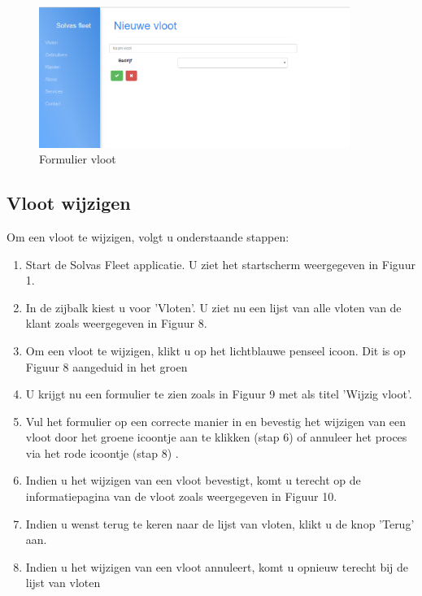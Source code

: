\documentclass[11pt,openany]{article}
\begin{document}
\begin{figure}
	\centering
	\includegraphics[width=0.9\textwidth]{fig9.png}
	\caption{Formulier vloot}
\end{figure}
\newpage

\subsection{Vloot wijzigen}
Om een vloot te wijzigen, volgt u onderstaande stappen:
\begin{enumerate}
	\item Start de Solvas Fleet applicatie. U ziet het startscherm weergegeven in Figuur 1.
	\item In de zijbalk kiest u voor 'Vloten'. U ziet nu een lijst van alle vloten van de klant zoals weergegeven in Figuur 8.
	\item Om een vloot te wijzigen, klikt u op het lichtblauwe penseel icoon. Dit is op Figuur 8 aangeduid in het groen
	\item U krijgt nu een formulier te zien zoals in Figuur 9 met als titel 'Wijzig vloot'.
	\item Vul het formulier op een correcte manier in en bevestig het wijzigen van een vloot door het groene icoontje aan te klikken (stap 6) of annuleer het proces via het rode icoontje (stap 8) .
	\item Indien u het wijzigen van een vloot bevestigt, komt u terecht op de informatiepagina van de vloot zoals weergegeven in Figuur 10. 
	\item Indien u wenst terug te keren  naar de lijst van vloten, klikt u de knop 'Terug' aan.
	\item Indien u het wijzigen van een vloot annuleert, komt u opnieuw terecht bij de lijst van vloten 
\end{enumerate}
\end{document}
